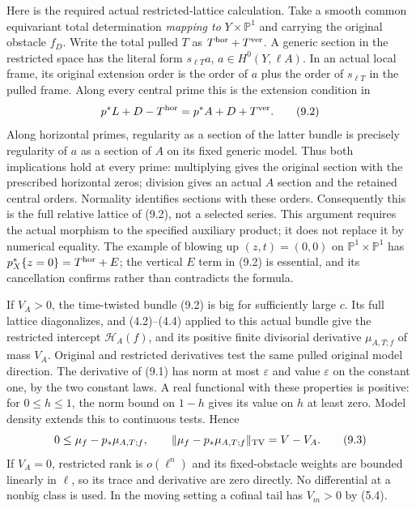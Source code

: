 \documentclass[10pt]{article}
\begin{document}
Here is the required actual restricted-lattice calculation. Take a smooth
common equivariant total determination \emph{mapping to}
$Y\times\mathbb P^1$ and carrying the original obstacle $f_D$.
Write the total pulled $T$ as $T^{\rm hor}+T^{\rm ver}$. A generic
section in the restricted space has the literal form $s_{\ell T}a$,
$a\in H^0(Y,\ell A)$. In an actual local frame, its original extension
order is the order of $a$ plus the order of $s_{\ell T}$ in the pulled
frame. Along every central prime this is the extension condition in
\[
 p^*L+D-T^{\rm hor}=p^*A+D+T^{\rm ver}.
 \tag{9.2}
\]
Along horizontal primes, regularity as a section of the latter bundle
is precisely regularity of $a$ as a section of $A$ on its fixed generic
model. Thus both implications hold at every prime: multiplying gives
the original section with the prescribed horizontal zeros; division
gives an actual $A$ section and the retained central orders.
Normality identifies sections with these orders. Consequently this is
the full relative lattice of (9.2), not a selected series. This argument
requires the actual morphism to the specified auxiliary product; it
does not replace it by numerical equality. The example of blowing up
$(z,t)=(0,0)$ on $\mathbb P^1\times\mathbb P^1$ has
$p_X^*\{z=0\}=T^{\rm hor}+E$; the vertical $E$ term in (9.2)
is essential, and its cancellation confirms rather than contradicts
the formula.

If $V_A>0$, the time-twisted bundle (9.2) is big for sufficiently
large $c$. Its full lattice diagonalizes, and (4.2)--(4.4) applied to
this actual bundle give the restricted intercept $\mathscr H_A(f)$,
and its positive finite divisorial derivative $\mu_{A,T;f}$ of mass
$V_A$. Original and restricted derivatives test the same pulled original
model direction. The derivative of (9.1) has norm at most $\varepsilon$
and value $\varepsilon$ on the constant one, by the two constant laws.
A real functional with these properties is positive: for $0\leq h\leq1$,
the norm bound on $1-h$ gives its value on $h$ at least zero.
Model density extends this to continuous tests. Hence
\[
 0\leq\mu_f-p_*\mu_{A,T;f},\qquad
 \|\mu_f-p_*\mu_{A,T;f}\|_{\rm TV}=V-V_A.
 \tag{9.3}
\]
If $V_A=0$, restricted rank is $o(\ell^n)$ and its fixed-obstacle
weights are bounded linearly in $\ell$, so its trace and derivative
are zero directly. No differential at a nonbig class is used. In the
moving setting a cofinal tail has $V_m>0$ by (5.4).
\end{document}
